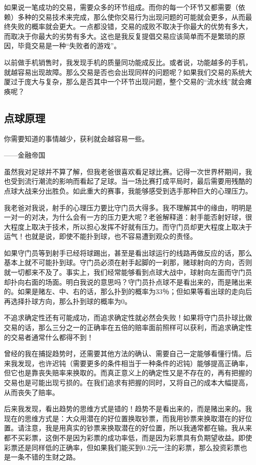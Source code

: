 如果说一笔成功的交易，需要众多的环节组成。而你的每一个环节又都需要（依赖）多种的交易技术来完成，那么使你交易行为出现问题的可能就会更多，从而最终失败的概率就会更大。一点都没错，交易的成败不取决于你最大的优势有多大，而取决于你最大的劣势有多大。这也是我反复提倡交易应该简单而不是繁琐的原因，毕竟交易是一种“失败者的游戏”。

以前做手机销售时，我发现手机的质量同功能成反比。或者说，功能越多的手机，就越容易出现故障。那么交易是否也会出现同样的问题呢？如果我们交易的系统大厦过于庞大与复杂，那么是否其中一个环节出现问题，整个交易的“流水线”就会瘫痪呢？

\subsection{点球原理}

{\kaishu
你需要知道的事情越少，获利就会越容易一些。

\hfill ——金融帝国
}

虽然我对足球并不算了解，但我老爸很喜欢看足球比赛。记得一次世界杯期间，我也受到流行潮流的影响而看起了足球。当一场比赛打成平局时，最后需要用残酷的点球大战来分出胜负。如此重大的赛事，我能够感受到选手那种巨大的心理压力。

我老爸对我说，射手的心理压力要比守门员大得多。我不理解其中的缘由，明明是一对一的对决，为什么会有一方的压力更大呢？老爸解释道：射手能否射好球，很大程度上取决于技术，所以担心发挥不好就有压力。而守门员却更大程度上取决于运气！也就是说，即使不能扑到球，也不容易遭到观众的责怪。

如果守门员等到射手已经将球踢出，甚至是看出球运行的线路再做反应的话，那么基本上就不可能扑到球。守门员必须在射手起脚的一刹那，赌球射向的方向，否则就一切都来不及了。事实上，我们经常能够看到点球大战中，球射向左面而守门员却扑向右面的场面。明白我说的意思吗？守门员扑点球不是看出来的，而是赌出来的。如果是赌左、中、右的话，那么扑到的概率为33％；但如果等看出球的走向后再选择扑球方向，那么扑到球的概率为0。

不追求确定性还有可能成功，而追求确定性就必然会失败！如果将守门员扑球比做交易的话，那么三分之一的正确率在五倍的赔率面前照样可以获利，而追求确定性的交易者通常什么都得不到！

曾经的我在捕捉趋势时，还需要其他方法的确认、需要自己一定能够看懂行情。后来我发现，也许迟钝（需要更多的条件相当于一种条件的迟钝）能够提高正确率，但它也是靠丧失赔率来换取的。而真正意义上的确定性又是不存在的，再有把握的交易也是可能出现亏损的。在我们追求有把握的同时，又将自己的成本大幅提高，从而丧失了赔率。

后来我发现，看出趋势的思维方式是错的！趋势不是看出来的，而是赌出来的。我现在的思维方式是：大众用潜在的好位置换取钞票，而我用钞票来换取潜在的好位置。请注意，我是用真实的钞票来换取潜在的好位置，所以我通常都在输。我从来都不买彩票，这倒不是因为彩票的成功率低，而是因为彩票具有负期望收益。即使彩票还是同样低的正确率，但如果我们能买到0.2元一注的彩票，那么投资彩票也是一条不错的生财之路。

